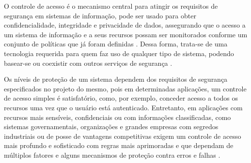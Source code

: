 
O controle de acesso é o mecanismo central para atingir os requisitos de segurança em sistemas de informação, pode ser usado para obter confidencialidade, integridade e privacidade de dados, assegurando que o acesso a um sistema de informação e a seus recursos possam ser monitorados conforme um conjunto de políticas que já foram definidas \cite{wang_conflicts_2010}. Dessa forma, trata-se de uma tecnologia requerida para quem faz uso de qualquer tipo de sistema, podendo basear-se ou coexistir com outros serviços de segurança \cite{samarati_access_2001} .

Os níveis de proteção de um sistema dependem dos requisitos de segurança especificados no projeto do mesmo, pois em determinadas aplicações, um controle de acesso simples é satisfatório, como, por exemplo, conceder acesso a todos os recursos uma vez que o usuário está autenticado. Entretanto, em aplicações com recursos mais sensíveis, confidenciais ou com informações classificadas, como sistemas governamentais, organizações e grandes empresas com segredos industriais ou de posse de vantagens competitivas exigem um controle de acesso mais profundo e sofisticado com regras mais aprimoradas e que dependam de múltiplos fatores e alguns mecanismos de proteção contra erros e falhas \cite{ferraiolo_policy_2011, silva_uma_2018}. 

